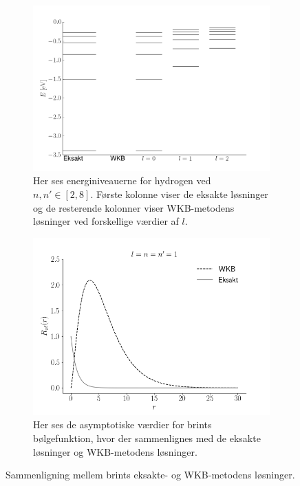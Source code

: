 \begin{figure}[h!]
    \centering
    \begin{subfigure}[t]{0.48\textwidth}
        \centering
        \includegraphics[width=\linewidth]{energyPlot}
        \caption{Her ses energiniveauerne for hydrogen ved $n, n'\in[2, 8]$. Første kolonne viser de eksakte løsninger og de resterende kolonner viser WKB-metodens løsninger ved forskellige værdier af $l$.} 
        \label{fig:hydrogen}
    \end{subfigure}%
    \hfill
    \begin{subfigure}[t]{0.48\textwidth}
        \centering
        \includegraphics[width=\linewidth]{sammenligning}
        \caption{Her ses de asymptotiske værdier for brints bølgefunktion, hvor der sammenlignes med de eksakte løsninger og WKB-metodens løsninger.}
        \label{fig:sammenligning}
    \end{subfigure}
    \caption{Sammenligning mellem brints eksakte- og WKB-metodens løsninger.}
    \label{bigfig}
\end{figure}
